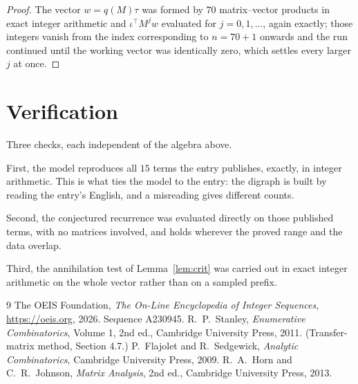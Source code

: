 \documentclass[11pt,a4paper]{article}
\theoremstyle{plain}
\theoremstyle{definition}
\begin{document}
\begin{proof}
The vector $w=q(M)\tau$ was formed by $70$ matrix--vector products in exact integer
arithmetic and $\iota^{\!\top}M^{j}w$ evaluated for $j=0,1,\dots$, again exactly; those
integers vanish from the index corresponding to $n=70+1$ onwards and the run continued
until the working vector was identically zero, which settles every larger $j$ at once.
\end{proof}

\section{Verification}

Three checks, each independent of the algebra above.

First, the model reproduces all $15$ terms the entry publishes, exactly, in integer
arithmetic. This is what ties the model to the entry: the digraph is built by reading the
entry's English, and a misreading gives different counts.

Second, the conjectured recurrence was evaluated directly on those published terms, with no
matrices involved, and holds wherever the proved range and the data overlap.

Third, the annihilation test of Lemma~\ref{lem:crit} was carried out in exact integer
arithmetic on the whole vector rather than on a sampled prefix.

\begin{thebibliography}{9}
 The OEIS Foundation, \emph{The On-Line Encyclopedia of Integer
Sequences}, \url{https://oeis.org}, 2026. Sequence A230945.
 R.~P.~Stanley, \emph{Enumerative Combinatorics}, Volume 1, 2nd ed.,
Cambridge University Press, 2011. (Transfer-matrix method, Section 4.7.)
 P.~Flajolet and R.~Sedgewick, \emph{Analytic Combinatorics}, Cambridge
University Press, 2009.
 R.~A.~Horn and C.~R.~Johnson, \emph{Matrix Analysis}, 2nd ed., Cambridge
University Press, 2013.
\end{thebibliography}
\end{document}
